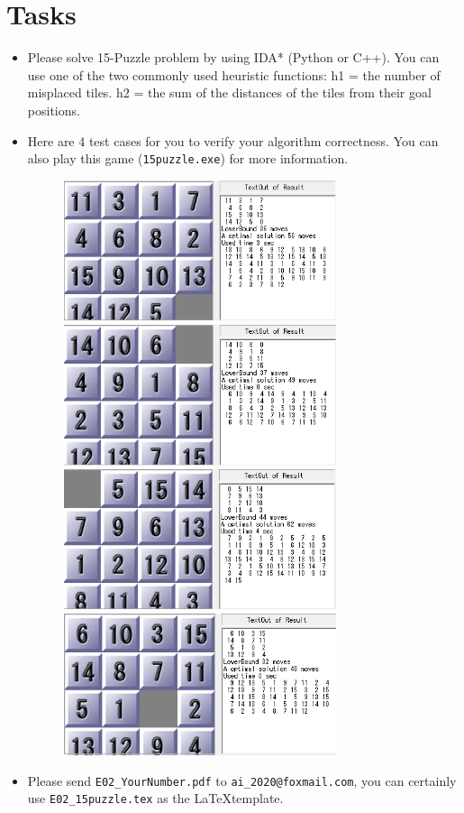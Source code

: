 \documentclass[a4paper, 11pt]{article}
\begin{document}
\section{Tasks}



\begin{itemize}
	\item Please solve 15-Puzzle problem by using IDA* (Python or C++). You can use one of the two commonly used heuristic functions: h1 = the number of misplaced tiles. h2 = the sum of the distances of the tiles from their goal positions. 
	\item Here are 4 test cases for you to verify your algorithm correctness. You can also play this game (\texttt{15puzzle.exe}) for more information.
	\begin{figure}[ht]
	\centering
	\includegraphics[width=8cm]{Pic/case1}
	\quad
	\includegraphics[width=8cm]{Pic/case2}
	\\
	\includegraphics[width=8cm]{Pic/case3}
	\quad
	\includegraphics[width=8cm]{Pic/case4}
	
	\end{figure}
	\item Please send \texttt{E02\_YourNumber.pdf} to \texttt{ai\_2020@foxmail.com}, you can certainly use \texttt{E02\_15puzzle.tex} as the \LaTeX template.
\end{itemize}
\end{document}
